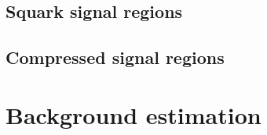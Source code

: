 \subsection{Squark signal regions}
\subsection{Compressed signal regions}

\section{Background estimation}

\subsection{\Zvv}
\subsection{\Wev}
\subsection{\ttbar}

